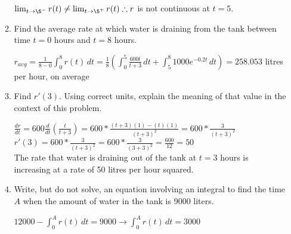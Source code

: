 \documentclass[10pt,letterpaper]{report}
\begin{document}
\begin{enumerate}
\begin{enumerate}
      $\lim_{t\to\5^{-}}r(t)\neq \lim_{t\to\5^{+}}r(t)\therefore r$ is not continuous at $t=5$. \\
      
    \item{Find the average rate at which water is draining from the tank between time $t=0$ hours and $t=8$ hours. \\}
    
      $r_{avg}=\frac{1}{8-0}\int_{0}^{8}{r(t)}\,dt=
      \frac{1}{8}\left(\int_{0}^{5}{\frac{600t}{t+3}}\,dt+\int_{5}^{8}{1000e^{-0.2t}}\,dt\right)=258.053$ litres per hour, on average \\
      
    \item{Find $r'(3)$. Using correct units, explain the meaning of that value in the context of this problem. \\} 
    
      $\frac{dr}{dt}=600\frac{d}{dt}\left(\frac{t}{t+3}\right)=600*\frac{(t+3)(1)-(t)(1)}{(t+3)^{2}}=600*\frac{3}{(t+3)^{2}}$ \\
      
      $r'(3)=600*\frac{3}{(t+3)^{2}}=600*\frac{3}{(3+3)^{2}}=\frac{600}{12}=50$ \\
      
      The rate that water is draining out of the tank at $t=3$ hours is increasing at a rate of 50 litres per hour squared. \\
      
    \item{Write, but do not solve, an equation involving an integral to find the time $A$ when the amount of water in the tank is 9000 liters. \\}
    
      $12000-\int_{0}^{A}{r(t)}\,dt=9000\rightarrow \int_{0}^{A}{r(t)}\,dt=3000$
  \end{enumerate}
\end{enumerate}
\end{document}
